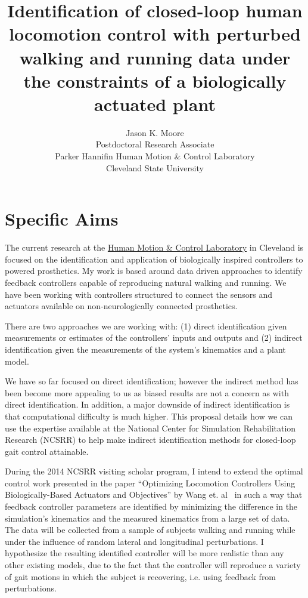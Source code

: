\documentclass[11pt]{article}
\title{Identification of closed-loop human locomotion control with perturbed
walking and running data under the constraints of a biologically actuated
plant}
\author{Jason K. Moore\\
  Postdoctoral Research Associate\\
  Parker Hannifin Human Motion \& Control Laboratory\\
  Cleveland State University
}
\begin{document}
\maketitle

\section*{Specific Aims}

The current research at the \href{http://hmc.csuohio.edu}{Human Motion \&
Control Laboratory} in Cleveland is focused on the identification and
application of biologically inspired controllers to powered prosthetics. My
work is based around data driven approaches to identify feedback controllers
capable of reproducing natural walking and running. We have been working with
controllers structured to connect the sensors and actuators available on
non-neurologically connected prosthetics.

There are two approaches we are working with: (1) direct identification given
measurements or estimates of the controllers' inputs and outputs and (2)
indirect identification given the measurements of the system's kinematics and a
plant model.

We have so far focused on direct identification; however the indirect method
has been become more appealing to us as biased results are not a concern
as with direct identification. In addition, a major downside of indirect identification is
that computational difficulty is much higher. This proposal details how we
can use the expertise available at the National Center for Simulation
Rehabilitation Research (NCSRR) to help make indirect identification methods
for closed-loop gait control attainable.

During the 2014 NCSRR visiting scholar program, I intend to extend the optimal
control work presented in the paper ``Optimizing Locomotion Controllers Using
Biologically-Based Actuators and Objectives'' by Wang et. al~\cite{Wang2012} in
such a way that feedback controller parameters are identified by minimizing the
difference in the simulation's kinematics and the measured kinematics from a
large set of data. The data will be collected from a sample of subjects walking
and running while under the influence of random lateral and longitudinal
perturbations. I hypothesize the resulting identified controller will be
more realistic than any other existing models, due to the fact that the
controller will reproduce a variety of gait motions in which the subject is
recovering, i.e. using feedback from perturbations.
\end{document}
